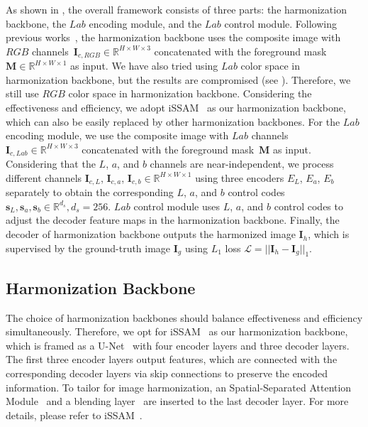 \documentclass[sigconf]{acmart}
\begin{document}
As shown in , the overall framework consists of three parts: the harmonization backbone, the $Lab$ encoding module, and the $Lab$ control module. 
Following previous works~\cite{issam, ssam}, the harmonization backbone uses the composite image with $RGB$ channels~$\bm{I}_{c, RGB} \in \mathbb{R}^{H \times W \times 3}$ concatenated with the foreground mask~$\bm{M} \in \mathbb{R}^{H \times W \times 1}$ as input. We have also tried using $Lab$ color space in harmonization backbone, but the results are compromised (see ). Therefore, we still use $RGB$ color space in harmonization backbone.
Considering the effectiveness and efficiency, we adopt iSSAM~\cite{issam} as our harmonization backbone, which can also be easily replaced by other harmonization backbones.
For the $Lab$ encoding module, we use the composite image with $Lab$ channels $\bm{I}_{c, \textit{Lab}} \in \mathbb{R}^{H \times W \times 3}$ concatenated with the foreground mask~$\bm{M}$ as input. 
Considering that the $L$, $a$, and $b$ channels are near-independent, we process different channels $\bm{I}_{c, \textit{L}}$, $\bm{I}_{c, \textit{a}}$, $\bm{I}_{c, \textit{b}} \in \mathbb{R}^{H \times W \times 1}$ using three encoders $E_L$, $E_a$, $E_b$ separately to obtain the corresponding $L$, $a$, and $b$ control codes $\bm{s}_{\textit{L}}, \bm{s}_{\textit{a}}, \bm{s}_{\textit{b}} \in \mathbb{R}^{d_{s}},d_{s}=256$.
$Lab$ control module uses $L$, $a$, and $b$ control codes to adjust the decoder feature maps in the harmonization backbone. 
Finally, the decoder of harmonization backbone outputs the harmonized image $\bm{I}_{h}$, which is supervised by the ground-truth image $\bm{I}_{g}$ using $L_1$ loss $\mathcal{L} = || \bm{I}_{h} - \bm{I}_{g} ||_1$. 

\subsection{Harmonization Backbone}\label{Backbone Network}

The choice of harmonization backbones should balance effectiveness and efficiency simultaneously.
Therefore, we opt for iSSAM~\cite{issam} as our harmonization backbone, which is framed as a U-Net~\cite{ronneberger2015u} with four encoder layers and three decoder layers.
The first three encoder layers output features, which are connected with the corresponding decoder layers via skip connections to preserve the encoded information.
To tailor for image harmonization, an Spatial-Separated Attention Module~\cite{ssam} and a blending layer~\cite{issam} are inserted to the last decoder layer. For more details, please refer to iSSAM~\cite{issam}.  
\end{document}

